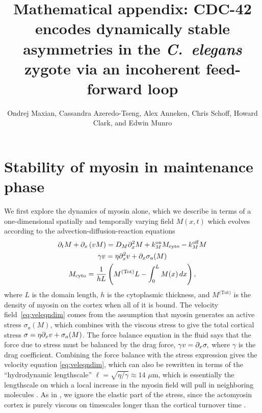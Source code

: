 \documentclass[11pt]{article}
\title{Mathematical appendix: CDC-42 encodes dynamically stable asymmetries in the \emph{C.\ elegans} zygote via an incoherent feed-forward loop}
\author{Ondrej Maxian, Cassandra Azeredo-Tseng, Alex Anneken, Chris Schoff, Howard Clark, and Edwin Munro  \vspace{-0.75 cm}}
\newcommand{\6}[1]{#1_{\text{6}}}
\newcommand{\3}[1]{#1_{\text{3}}}
\newcommand{\Tot}[1]{#1^\text{(Tot)}}
\newcommand{\My}[1]{#1_M}
\begin{document}
\maketitle 

\section{Stability of myosin in maintenance phase \label{sec:myosin}}
We first explore the dynamics of myosin alone, which we describe in terms of a one-dimensional spatially and temporally varying field $M(x,t)$ which evolves according to the advection-diffusion-reaction equations \cite{bois2011pattern}
\begin{subequations}
\label{eq:MyOnly}
\begin{gather}
\Dt M + \Dx \left(v M\right) = D_M \Dx^2 M +\My{\kon}M_\text{cyto} - \My{\koff} M \\
\label{eq:veleqndim}
\gamma v = \eta \Dx^2 v + \Dx \sigma_a(M)\\
M_\text{cyto} = \frac{1}{hL}\left(\Tot{M}L-\int_0^L M(x) \, dx\right),
\end{gather}
\end{subequations}
where $L$ is the domain length, $h$ is the cytoplasmic thickness, and $\Tot{M}$ is the density of myosin on the cortex when all of it is bound. The velocity field\ \eqref{eq:veleqndim} comes from the assumption that myosin generates an active stress $\sigma_a(M)$, which combines with the viscous stress to give the total cortical stress $\sigma = \eta \partial_x{v} + \sigma_a(M)$. The force balance equation in the fluid says that the force due to stress must be balanced by the drag force, $\gamma v = \partial_x \sigma,$
where $\gamma$ is the drag coefficient. Combining the force balance with the stress expression gives the velocity equation \eqref{eq:veleqndim}, which can also be rewritten in terms of the ``hydrodynamic lengthscale'' $\ell=\sqrt{\eta/\gamma} \approx 14$ $\mu$m, which is essentially the lengthscale on which a local increase in the myosin field will pull in neighboring molecules  \cite{mayer2010anisotropies}. As in \cite{bois2011pattern}, we ignore the elastic part of the stress, since the actomyosin cortex is purely viscous on timescales longer than the cortical turnover time \cite{mayer2010anisotropies}. 
\end{document}
